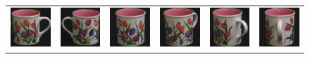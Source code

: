 \begin{figure}[p]
\begin{tabular}{cccccc}
\includegraphics[width=2cm]{coil/beeld-6.eps} &
\includegraphics[width=2cm]{coil/beeld-7.eps} &
\includegraphics[width=2cm]{coil/beeld-8.eps} &
\includegraphics[width=2cm]{coil/beeld-9.eps} &
\includegraphics[width=2cm]{coil/beeld-10.eps} &
\includegraphics[width=2cm]{coil/beeld-11.eps} \\


\end{tabular}
\end{figure}
